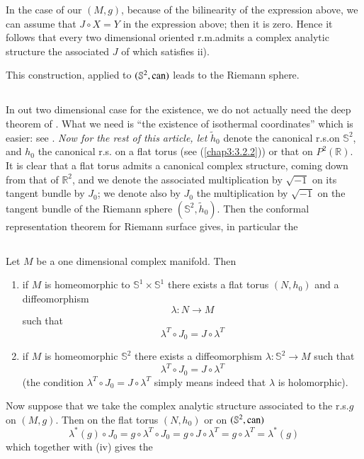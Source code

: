 In the case of our $(M,g)$, because of the bilinearity of the
expression above, we can assume that $J\circ X=Y$ in the expression
above; then it is zero. Hence it follows that every two dimensional
oriented r.m.\@ admits a complex analytic structure the associated $J$
of which satisfies ii).

This construction, applied to $(\mathbb{S}^{2},\operatorname{can})$ leads to the
Riemann sphere.

\subsection{}\label{chap8:8.11.1}

\begin{remark*}
In out two dimensional case for the existence, we do not actually need
the deep theorem of \cite{23}. What we need is ``the existence of
isothermal coordinates'' which is easier: see \cite{10}. {\em Now for
  the rest of this article, let} $\widetilde{h}_{0}$ denote the
canonical r.s.\@ on $\mathbb{S}^{2}$, and $h_{0}$ the canonical r.s.\@
on a flat torus (see (\ref{chap3:3.2.2})) or that on $P^{2}(\mathbb{R})$. It
is clear that a flat torus admits a canonical complex structure,
coming down from that of $\mathbb{R}^{2}$, and we denote the
associated multiplication by $\sqrt{-1}$ on its tangent bundle by
$J_{0}$; we denote also by $J_{0}$ the multiplication by $\sqrt{-1}$
on the tangent bundle of the Riemann sphere
$(\mathbb{S}^{2},\widetilde{h}_{0})$. Then the conformal
representation theorem \pageoriginale for Riemann surface gives, in
particular the 
\end{remark*}

\subsection{}\label{chap8:8.11.2}

\begin{theorem*}
Let $M$ be a one dimensional complex manifold. Then
\begin{enumerate}
\renewcommand{\theenumi}{\roman{enumi}}
\renewcommand{\labelenumi}{\rm\theenumi)}
\item if $M$ is homeomorphic to $\mathbb{S}^{1}\times\mathbb{S}^{1}$
  there exists a flat torus $(N,h_{0})$ and a diffeomorphism
$$
\lambda:N\to M
$$
such that
$$
\lambda^{T}\circ J_{0}=J\circ \lambda^{T}
$$

\item if $M$ is homeomorphic $\mathbb{S}^{2}$ there exists a
  diffeomorphism $\lambda:\mathbb{S}^{2}\to M$ such that
$$
\lambda^{T}\circ J_{0}=J\circ \lambda^{T}
$$
(the condition $\lambda^{T}\circ J_{0}=J\circ \lambda^{T}$ simply
means indeed that $\lambda$ is holomorphic).
\end{enumerate}

Now suppose that we take the complex analytic structure associated to
the r.s.\@ $g$ on $(M,g)$. Then on the flat torus $(N,h_{0})$ or on
$(\mathbb{S}^{2},\operatorname{can})$
$$ 
\lambda^{\ast}(g)\circ J_{0}=g\circ \lambda^{T}\circ J_{0}=g\circ
J\circ \lambda^{T}=g\circ \lambda^{T}=\lambda^{\ast}(g)
$$
which together with (iv) gives the
\end{theorem*}


